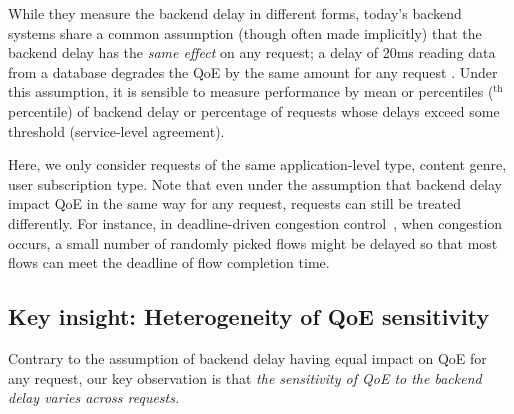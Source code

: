 While they measure the backend delay in different forms, today's backend systems share a common assumption (though often made implicitly) that the backend delay has the {\em same effect} on any request; \eg a delay of 20ms reading data from a database degrades the QoE by the same amount for any request . 
Under this assumption, it is sensible to measure performance by mean or percentiles ($^\textrm{th}$ percentile) of backend delay or percentage of requests whose delays exceed some threshold (\eg service-level agreement).

Here, we only consider requests of the same application-level type, \eg content genre, user subscription type.
Note that even under the assumption that backend delay impact QoE in the same way for any request, requests can still be treated differently. For instance, in deadline-driven congestion control~\cite{??}, when congestion occurs, a small number of randomly picked flows might be delayed so that most flows can meet the deadline of flow completion time. 

\subsection{Key insight: Heterogeneity of QoE sensitivity}

Contrary to the assumption of backend delay having equal impact on QoE for any request, our key observation is that 
{\em the sensitivity of QoE to the backend delay varies across requests.}

